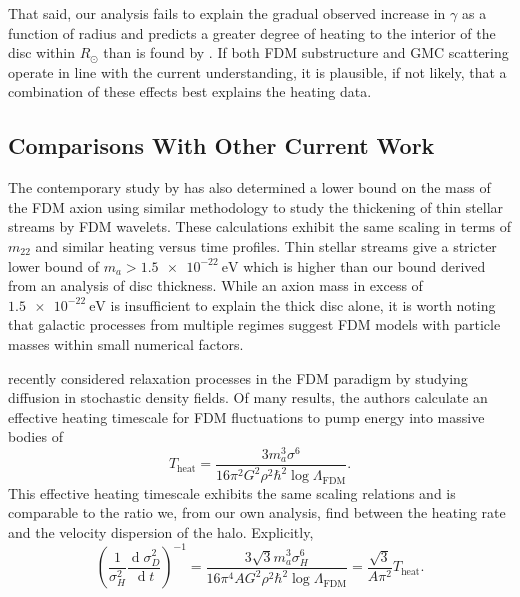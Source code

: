 \documentclass[usenatbib]{mnras}
\renewcommand{\d}[1]{\! \mathrm{d}#1 \:}
\newcommand{\deriv}[2]{\frac{\d{#1}}{\d{#2}}}
\renewcommand{\d}[1]{\ensuremath{\operatorname{d}\!{#1}}}
\begin{document}
That said, our analysis fails to explain the gradual observed increase in $\gamma$ as a function of radius and predicts a greater degree of heating to the interior of the disc within $R_{\odot}$ than is found by \cite{Gaia_vertical_motions}. If both FDM substructure and GMC scattering operate in line with the current understanding, it is plausible, if not likely, that a combination of these effects best explains the heating data.

\subsection{Comparisons With Other Current Work}

The contemporary study by \cite{stellar_streams_bound} has also determined a lower bound on the mass of the FDM axion using similar methodology to study the thickening of thin stellar streams by FDM wavelets. These calculations exhibit the same scaling in terms of $m_{22}$ and similar heating versus time profiles. Thin stellar streams give a stricter lower bound of $m_a > \SI{1.5 e-22}{\electronvolt}$ which is higher than our bound derived from an analysis of disc thickness. While an axion mass in excess of $\SI{1.5 e-22}{\electronvolt}$ is insufficient to explain the thick disc alone, it is worth noting that galactic processes from multiple regimes suggest FDM models with particle masses within small numerical factors.    
\par 
\cite{relaxation} recently considered relaxation processes in the FDM paradigm by studying diffusion in stochastic density fields. Of many results, the authors calculate an effective heating timescale for FDM fluctuations to pump energy into massive bodies of
\begin{equation}
T_{\text{heat}} = \frac{3 m_a^3 \sigma^6}{16 \pi^2 G^2 \rho^2 \hbar^2 \log{\Lambda_{\text{FDM}}}} .
\end{equation}  
This effective heating timescale exhibits the same scaling relations and is comparable to the ratio we, from our own analysis, find between the heating rate and the velocity dispersion of the halo. Explicitly,
\begin{equation}
\left( \frac{1}{\sigma_H^2} \deriv{\sigma_D^2}{t} \right)^{-1} = \frac{3 \sqrt{3} m_a^3 \sigma_H^6}{16 \pi^4 A G^2 \rho^2 \hbar^2 \log{\Lambda_{\text{FDM}}}} = \frac{\sqrt{3} }{A \pi^2} T_{\text{heat}}.
\end{equation}
\end{document}
